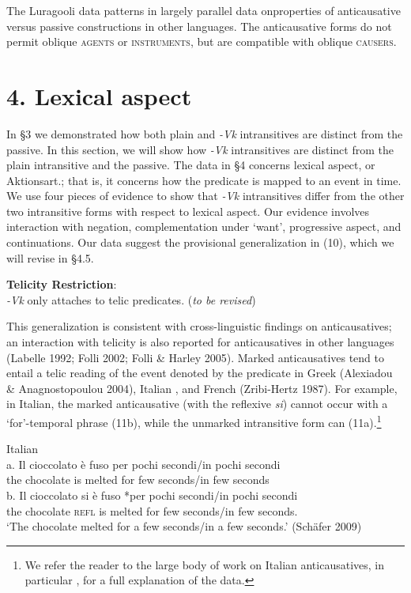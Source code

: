 \documentclass[output=paper]{langsci/langscibook}
\begin{document}
The Luragooli data patterns in  largely parallel data onproperties of anticausative versus passive constructions in other languages. The anticausative forms do not permit oblique \textsc{agents} or \textsc{instruments}, but are compatible with oblique \textsc{causers.}

\chapter{4. Lexical aspect}

In §3 we demonstrated how both plain and \textit{{}-Vk} intransitives are distinct from the passive. In this section, we will show how \textit{{}-Vk }intransitives are distinct from the plain intransitive and the passive. The data in §4 concerns lexical aspect, or Aktionsart.; that is, it concerns how the predicate is mapped to an event in time. We use four pieces of evidence to show that \textit{{}-Vk} intransitives differ from the other two intransitive forms with respect to lexical aspect. Our evidence involves interaction with negation, complementation under ‘want’, progressive aspect, and continuations. Our data suggest the provisional generalization in (10), which we will revise in §4.5.

\ea
{\textbf{Telicity Restriction}:}\\
\glt \textit{{}-Vk }only attaches to telic predicates. (\textit{to be revised})
\z

This generalization is consistent with cross-linguistic findings on anticausatives; an interaction with telicity is also reported for anticausatives in other languages (Labelle 1992; Folli 2002; Folli \& Harley 2005). Marked anticausatives tend to entail a telic reading of the event denoted by the predicate in Greek (Alexiadou \& Anagnostopoulou 2004), Italian \citep{Folli2002}, and French (Zribi-Hertz 1987). For example, in Italian, the marked anticausative (with the reflexive \textit{si}) cannot occur with a ‘for’-temporal phrase (11b), while the unmarked intransitive form can (11a).\footnote{ We refer the reader to the large body of work on Italian anticausatives, in particular \citet{Folli2002}, for a full explanation of the data.}

\ea
{Italian}\\
\gll a.  Il   cioccolato è  fuso     per pochi secondi/in pochi secondi\\
       the chocolate  is melted for few    seconds/in few    seconds\\
\gll b.  Il    cioccolato si     è  fuso     *per pochi secondi/in pochi secondi\\
       the chocolate  \textsc{refl} is melted  for   few   seconds/in few seconds. \\
\glt ‘The chocolate melted for a few seconds/in a few seconds.’     (Schäfer 2009)
\z
\end{document}
